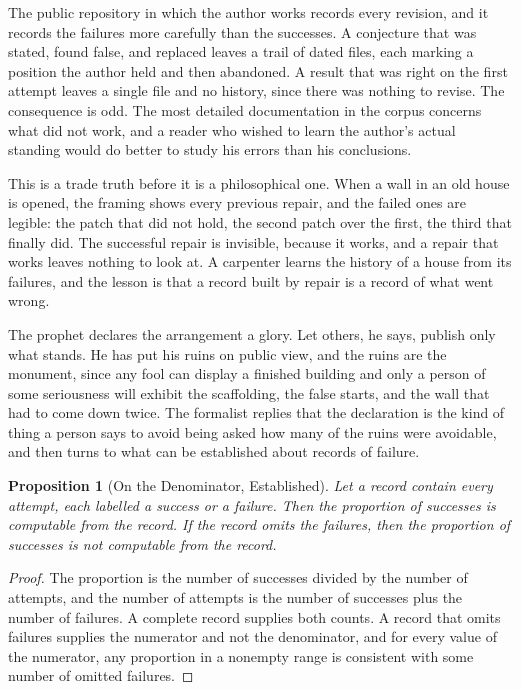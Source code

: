 \documentclass[11pt,openany,twoside]{book}
\theoremstyle{plain}
\newtheorem{proposition}{Proposition}[chapter]
\theoremstyle{definition}
\theoremstyle{remark}
\begin{document}
The public repository in which the author works records every revision, and it records the failures more carefully than the successes. A conjecture that was stated, found false, and replaced leaves a trail of dated files, each marking a position the author held and then abandoned. A result that was right on the first attempt leaves a single file and no history, since there was nothing to revise. The consequence is odd. The most detailed documentation in the corpus concerns what did not work, and a reader who wished to learn the author's actual standing would do better to study his errors than his conclusions.

This is a trade truth before it is a philosophical one. When a wall in an old house is opened, the framing shows every previous repair, and the failed ones are legible: the patch that did not hold, the second patch over the first, the third that finally did. The successful repair is invisible, because it works, and a repair that works leaves nothing to look at. A carpenter learns the history of a house from its failures, and the lesson is that a record built by repair is a record of what went wrong.

The prophet declares the arrangement a glory. Let others, he says, publish only what stands. He has put his ruins on public view, and the ruins are the monument, since any fool can display a finished building and only a person of some seriousness will exhibit the scaffolding, the false starts, and the wall that had to come down twice. The formalist replies that the declaration is the kind of thing a person says to avoid being asked how many of the ruins were avoidable, and then turns to what can be established about records of failure.

\begin{proposition}[On the Denominator, Established]\label{prop:denominator}
Let a record contain every attempt, each labelled a success or a failure. Then the proportion of successes is computable from the record. If the record omits the failures, then the proportion of successes is not computable from the record.
\end{proposition}

\begin{proof}
The proportion is the number of successes divided by the number of attempts, and the number of attempts is the number of successes plus the number of failures. A complete record supplies both counts. A record that omits failures supplies the numerator and not the denominator, and for every value of the numerator, any proportion in a nonempty range is consistent with some number of omitted failures.
\end{proof}
\end{document}
